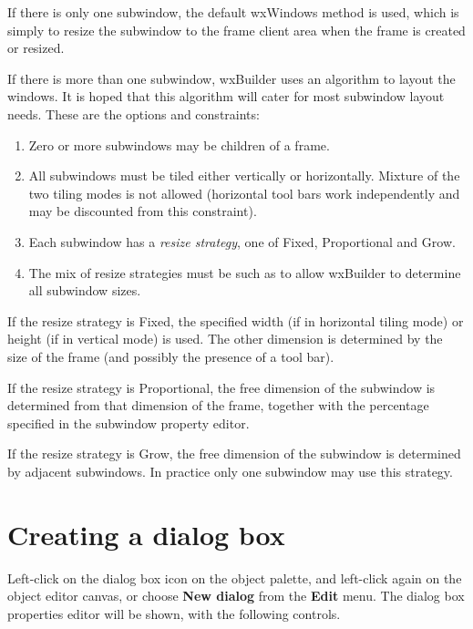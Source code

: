 If there is only one subwindow, the default wxWindows method is used, which is
simply to resize the subwindow to the frame client area when the frame is created
or resized.

If there is more than one subwindow, wxBuilder uses an algorithm to
layout the windows. It is hoped that this algorithm will cater for most
subwindow layout needs. These are the options and constraints:

\begin{enumerate}
\item Zero or more subwindows may be children of a frame.
\item All subwindows must be tiled either vertically or horizontally.
Mixture of the two tiling modes is not allowed (horizontal tool bars work
independently and may be discounted from this constraint).
\item Each subwindow has a {\it resize strategy}, one of
Fixed, Proportional and Grow.
\item The mix of resize strategies must be such as to allow
wxBuilder to determine all subwindow sizes.
\end{enumerate}

If the resize strategy is Fixed, the specified width (if in horizontal
tiling mode) or height (if in vertical mode) is used. The other
dimension is determined by the size of the frame (and possibly the
presence of a tool bar).

If the resize strategy is Proportional, the free dimension of the
subwindow is determined from that dimension of the frame, together
with the percentage specified in the subwindow property editor.

If the resize strategy is Grow, the free dimension of the
subwindow is determined by adjacent subwindows. In practice
only one subwindow may use this strategy.

\section{Creating a dialog box}

Left-click on the dialog box icon on the object palette, and left-click
again on the object editor canvas, or choose {\bf New dialog} from
the {\bf Edit} menu. The dialog box properties editor will be shown,
with the following controls.

